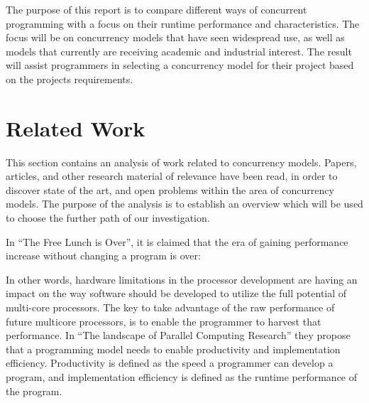 The purpose of this report is to compare different ways of concurrent programming with a focus on their runtime performance and characteristics. The focus will be on concurrency models that have seen widespread use, as well as models that currently are receiving academic and industrial interest. The result will assist programmers in selecting a concurrency model for their project based on the projects requirements.

\section{Related Work}\label{sec:relatedwork}
This section contains an analysis of work related to concurrency models. Papers, articles, and other research material of relevance have been read, in order to discover state of the art, and open problems within the area of concurrency models. The purpose of the analysis is to establish an overview which will be used to choose the further path of our investigation.

In ``The Free Lunch is Over''\cite{sutter2005free}, it is claimed that the era of gaining performance increase without changing a program is over:


In other words, hardware limitations in the processor development are having an impact on the way software should be developed to utilize the full potential of multi-core processors. The key to take advantage of the raw performance of future multicore processors, is to enable the programmer to harvest that performance\cite[p. 31]{asanovic2006landscape}. In ``The landscape of Parallel Computing Research''\cite{asanovic2006landscape} they propose that a programming model needs to enable productivity and implementation efficiency\cite[p. 31]{asanovic2006landscape}. Productivity is defined as the speed a programmer can develop a program, and implementation efficiency is defined as the runtime performance of the program.


